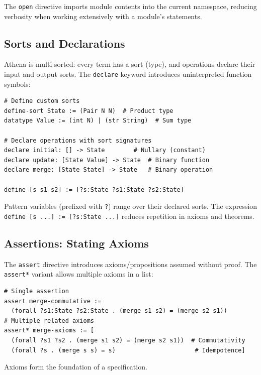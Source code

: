 The \lstinline{open} directive imports module contents into the current namespace, reducing verbosity when working extensively with a module's statements.

\subsection{Sorts and Declarations}

Athena is multi-sorted: every term has a sort (type), and operations declare their input and output sorts. The \lstinline{declare} keyword introduces uninterpreted function symbols:

\begin{lstlisting}[language=Athena,style=athena,caption={Sort declarations and function signatures}]
# Define custom sorts
define-sort State := (Pair N N)  # Product type
datatype Value := (int N) | (str String)  # Sum type

# Declare operations with sort signatures
declare initial: [] -> State        # Nullary (constant)
declare update: [State Value] -> State  # Binary function
declare merge: [State State] -> State   # Binary operation

define [s s1 s2] := [?s:State ?s1:State ?s2:State]
\end{lstlisting}

Pattern variables (prefixed with \lstinline{?}) range over their declared sorts. The expression \lstinline{define [s ...] := [?s:State ...]} reduces repetition in axioms and theorems.

\subsection{Assertions: Stating Axioms}

The \lstinline{assert} directive introduces axioms/propositions assumed without proof. The \lstinline{assert*} variant allows multiple axioms in a list:

\begin{lstlisting}[language=Athena,style=athena,caption={Axiomatic specification of merge}]
# Single assertion
assert merge-commutative := 
  (forall ?s1:State ?s2:State . (merge s1 s2) = (merge s2 s1))
# Multiple related axioms
assert* merge-axioms := [
  (forall ?s1 ?s2 . (merge s1 s2) = (merge s2 s1))  # Commutativity
  (forall ?s . (merge s s) = s)                      # Idempotence]
\end{lstlisting}

Axioms form the foundation of a specification.

